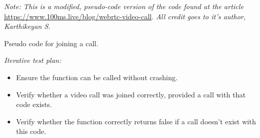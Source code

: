 \textit{Note: This is a modified, pseudo-code version of the code 
found at the article} \url{https://www.100ms.live/blog/webrtc-video-call}.
\textit{All credit goes to it's author, Karthikeyan S.}

\begin{algorithm}[H]
\caption{Pseudo code for joining a call.}
\label{alg:join}
\sffamily

\begin{algorithmic}[1]

    \State{}

    \State{}

     
    
     

     

    \State{}



    \State{}

  \EndFunction
\end{algorithmic}

\end{algorithm}
\mdseries

\textit{Iterative test plan: }  \\

\begin{itemize}

\item{Ensure the function can be called without crashing.} 

\item{Verify whether a video call was joined correctly, 
provided a call with that code exists.}

\item{Verify whether the function correctly returns false 
if a call doesn't exist with this code.}

\end{itemize}

